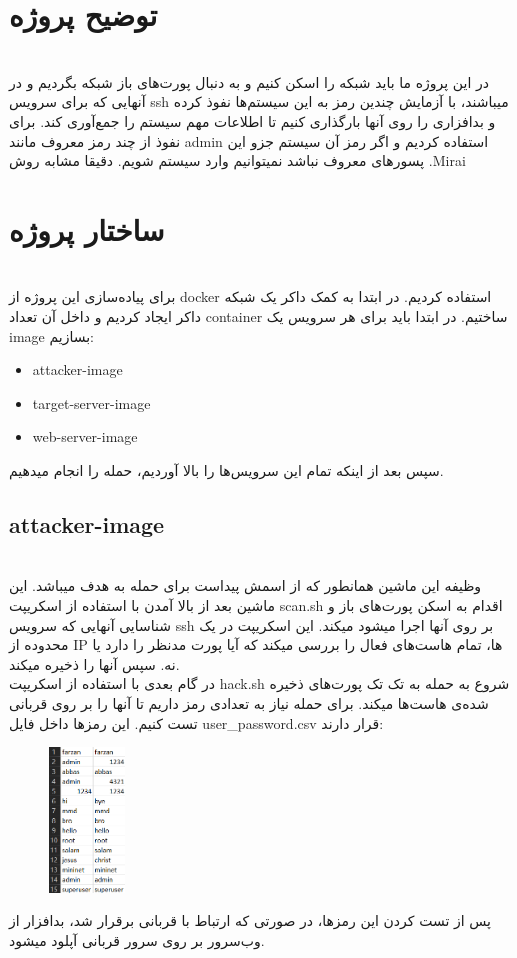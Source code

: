 \documentclass{article}
\begin{document}
\section {توضیح پروژه}
\leavevmode
\\
در این پروژه ما باید شبکه را اسکن کنیم و به دنبال پورت‌های باز شبکه بگردیم و در آنهایی که برای سرویس ssh میباشند، با آزمایش چندین رمز به این سیستم‌ها نفوذ کرده و بدافزاری را روی آنها بارگذاری کنیم تا اطلاعات مهم سیستم را جمع‌آوری کند. برای نفوذ از چند رمز معروف مانند admin استفاده کردیم و اگر رمز آن سیستم جزو این پسور‌های معروف نباشد نمیتوانیم وارد سیستم شویم. دقیقا مشابه روش .Mirai
\\
\section{ساختار پروژه}
\leavevmode
\\
برای پیاده‌سازی این پروژه از docker استفاده کردیم. در ابتدا به کمک داکر یک شبکه داکر ایجاد کردیم و داخل آن تعداد container ساختیم. در ابتدا باید برای هر سرویس یک image بسازیم:
\begin{itemize}
\item attacker-image
\item target-server-image
\item web-server-image
\end{itemize}
سپس بعد از اینکه تمام این سرویس‌ها را بالا آوردیم، حمله را انجام میدهیم.\\
\subsection{attacker-image}
\leavevmode 
\\
وظیفه این ماشین همانطور که از اسمش پیداست برای حمله به هدف میباشد. این ماشین بعد از بالا آمدن با استفاده از اسکریپت scan.sh اقدام به اسکن پورت‌های باز و شناسایی آنهایی که سرویس ssh بر روی آنها اجرا میشود میکند. این اسکریپت در یک محدوده از IP ها، تمام هاست‌های فعال را بررسی میکند که آیا پورت مدنظر را دارد یا نه. سپس آنها را ذخیره میکند. \\
در گام بعدی با استفاده از اسکریپت hack.sh شروع به حمله به تک تک پورت‌های ذخیره شده‌ی هاست‌ها میکند. برای حمله نیاز به تعدادی رمز داریم تا آنها را بر روی قربانی تست کنیم. این رمز‌ها داخل فایل user\_password.csv قرار دارند:
\begin{figure}[h]
\centering
\includegraphics[width=0.18\textwidth]{images/csv.png}
\end{figure}
پس از تست کردن این رمزها، در صورتی که ارتباط با قربانی برقرار شد، بدافزار از وب‌سرور بر روی سرور قربانی آپلود میشود. \\
\end{document}
